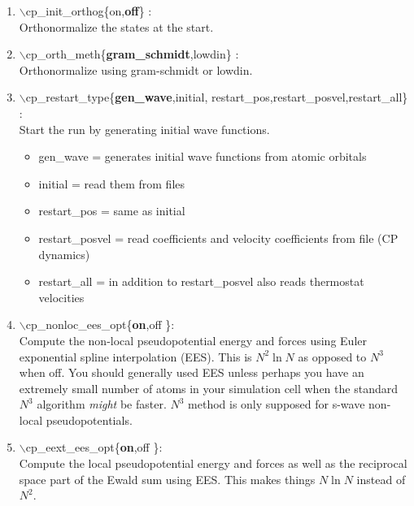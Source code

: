 \documentclass[12pt,titlepage]{article}
\begin{document}
\begin{enumerate}
 
 \vspace{0.15in} 
 \item  $\backslash$cp\_init\_orthog\{on,{\bf off}\} : \\
      Orthonormalize the states at the start.

 \vspace{0.15in} 
 \item  $\backslash$cp\_orth\_meth\{{\bf gram\_schmidt},lowdin\} : \\
      Orthonormalize using gram-schmidt or lowdin.

 \vspace{0.15in} 
 \item  $\backslash$cp\_restart\_type\{{\bf gen\_wave},initial,
                         restart\_pos,restart\_posvel,restart\_all\} : \\
      Start the run by generating initial wave functions.
      \begin{itemize}
\item      gen\_wave = generates initial wave functions from atomic orbitals
\item      initial = read them from files
\item       restart\_pos = same as initial  
\item       restart\_posvel = read coefficients and velocity coefficients from file (CP dynamics)
\item       restart\_all = in addition to restart\_posvel also reads thermostat velocities
      \end{itemize}

 \vspace{0.15in} 
 \item  $\backslash$cp\_nonloc\_ees\_opt\{{\bf on},off \}: \\     
 Compute the non-local pseudopotential energy and forces using Euler
 exponential spline interpolation (EES).  This is $N^2\ln N$ as opposed to $N^3$ when off.
 You should generally used EES unless perhaps you have an extremely small number of atoms
 in your simulation cell when the standard $N^3$ algorithm {\it might} be faster.  $N^3$ method is
 only supposed for s-wave non-local pseudopotentials.

 \vspace{0.15in} 
 \item  $\backslash$cp\_eext\_ees\_opt\{{\bf on},off \}: \\     
     Compute the local pseudopotential energy and forces as well as the 
     reciprocal space part of the Ewald sum using  EES.  This makes things $N\ln N$ instead of $N^2$.


\end{enumerate}
\end{document}

